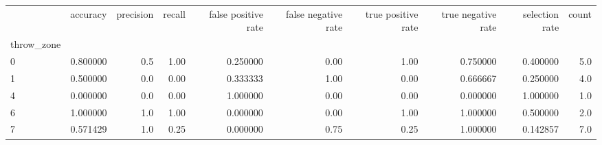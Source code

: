 \begin{tabular}{lrrrrrrrrr}
\toprule
{} &  accuracy &  precision &  recall &  false positive rate &  false negative rate &  true positive rate &  true negative rate &  selection rate &  count \\
throw\_zone &           &            &         &                      &                      &                     &                     &                 &        \\
\midrule
0          &  0.800000 &        0.5 &    1.00 &             0.250000 &                 0.00 &                1.00 &            0.750000 &        0.400000 &    5.0 \\
1          &  0.500000 &        0.0 &    0.00 &             0.333333 &                 1.00 &                0.00 &            0.666667 &        0.250000 &    4.0 \\
4          &  0.000000 &        0.0 &    0.00 &             1.000000 &                 0.00 &                0.00 &            0.000000 &        1.000000 &    1.0 \\
6          &  1.000000 &        1.0 &    1.00 &             0.000000 &                 0.00 &                1.00 &            1.000000 &        0.500000 &    2.0 \\
7          &  0.571429 &        1.0 &    0.25 &             0.000000 &                 0.75 &                0.25 &            1.000000 &        0.142857 &    7.0 \\
\bottomrule
\end{tabular}
